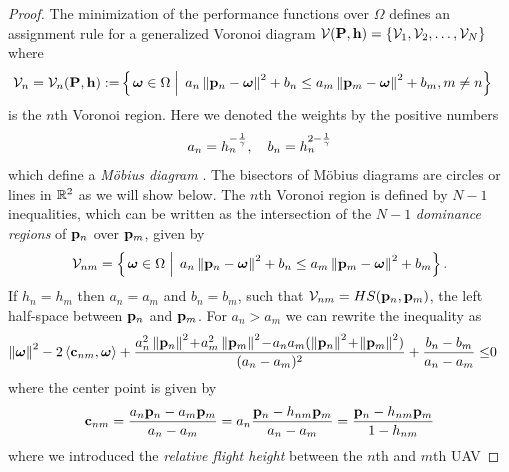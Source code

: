 \documentclass[smallabstract,smallcaptions]{dccpaper}
\newif\ifproof\prooffalse %
\newcommand{\gP}{\ensuremath{\vP}}          %
\newcommand{\bH}{\ensuremath{\vh}}          %
\newcommand{\Vor}{\ensuremath{\mathcal{V}}}         %
\begin{document}
%
\ifproof
\begin{proof}
  The minimization of the performance functions over $\Omega$ defines an assignment rule for a generalized Voronoi diagram
  $\Vor(\gP,\bH)=\{\Vor_1,\Vor_2,\dots,\Vor_N\}$ where 
  \begin{align}
    \Vor_{n} =\Vor_n(\gP,\bH):=
      &\set{\vome\in\Ome}{ a_n\Norm{\vp_n-\vome}^2 +b_n \leq  a_m\Norm{\vp_m-\vome}^2 +b_m, m\not=n}
  \end{align}
  is the $n$th Voronoi region. Here we denoted the weights by the positive numbers
  \begin{align}
    a_n = h_n^{-\frac{1}{\gamma}}, \quad b_n=h_n^{2-\frac{1}{\gamma}}
  \end{align}
  which define a \emph{M{\"o}bius diagram} \cite{BK06b,BWY07}. The bisectors of M{\"o}bius diagrams are circles or lines
  in ${\mathbb R}^2$ as we will show below.
  The $n$th Voronoi region is defined by $N-1$ inequalities, which  can be written as the intersection of the $N-1$
  \emph{dominance regions} of ${\mathbf p}_n$ over ${\mathbf p}_m$, given by 
  \begin{align}
    \Vor_{nm}=\set{\vome\in\Ome}{ a_n\Norm{\vp_n-\vome}^2 +b_n \leq  a_m\Norm{\vp_m-\vome}^2 +b_m}.
  \end{align}
  If $h_n=h_m$ then $a_n=a_m$ and $b_n=b_m$, such that $\Vor_{nm}=HS(\vp_n,\vp_m)$, the left half-space between ${\mathbf p}_n$
  and ${\mathbf p}_m$. For $a_n>a_m$ we can rewrite the inequality as 
  \begin{align*}
       \left\|\boldsymbol{ \omega}\right\| ^2 -2  \left\langle {\ensuremath{\mathbf c}}_{nm},\boldsymbol{ \omega} \right\rangle  + 
         \frac{a_n^2  \left\|{\mathbf p}_n\right\| ^2 \!+\!a_m^2  \left\|{\mathbf p}_m\right\| ^2 \!-\! a_na_m( \left\|{\mathbf p}_n\right\| ^2 \!+\! \left\|{\mathbf p}_m\right\| ^2)}{(a_n-a_m)^2} 
         + \frac{b_n-b_m}{a_n-a_m} \leq & 0
  \end{align*}
  where the center point is given by
  \begin{align}
    {\ensuremath{\mathbf c}}_{nm}=\frac{a_n{\mathbf p}_n- a_m{\mathbf p}_m}{a_n-a_m}=a_n \frac{{\mathbf p}_n-h_{nm} {\mathbf p}_m}{a_n -a_m}=\frac{{\mathbf p}_n -h_{nm}{\mathbf p}_m}{1-h_{nm}} 
  \end{align}
  where we introduced the \emph{relative flight height} between the $n$th and $m$th UAV

\end{proof}
\end{document}
